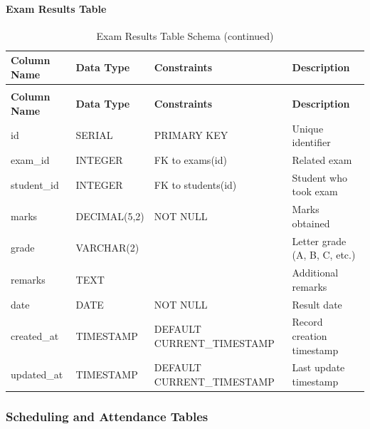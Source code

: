 \documentclass[12pt,a4paper]{report}
\begin{document}
\paragraph{Exam Results Table}
\begin{longtable}{|p{3cm}|p{3cm}|p{2cm}|p{6cm}|}
\caption{Exam Results Table Schema}
\label{tab:exam-results}\\
\hline
\textbf{Column Name} & \textbf{Data Type} & \textbf{Constraints} & \textbf{Description} \\
\hline
\endfirsthead
\caption[]{Exam Results Table Schema (continued)}\\
\hline
\textbf{Column Name} & \textbf{Data Type} & \textbf{Constraints} & \textbf{Description} \\
\hline
\endhead
id & SERIAL & PRIMARY KEY & Unique identifier \\
\hline
exam\_id & INTEGER & FK to exams(id) & Related exam \\
\hline
student\_id & INTEGER & FK to students(id) & Student who took exam \\
\hline
marks & DECIMAL(5,2) & NOT NULL & Marks obtained \\
\hline
grade & VARCHAR(2) & & Letter grade (A, B, C, etc.) \\
\hline
remarks & TEXT & & Additional remarks \\
\hline
date & DATE & NOT NULL & Result date \\
\hline
created\_at & TIMESTAMP & DEFAULT CURRENT\_TIMESTAMP & Record creation timestamp \\
\hline
updated\_at & TIMESTAMP & DEFAULT CURRENT\_TIMESTAMP & Last update timestamp \\
\hline
\end{longtable}

\subsubsection{Scheduling and Attendance Tables}
\end{document}
